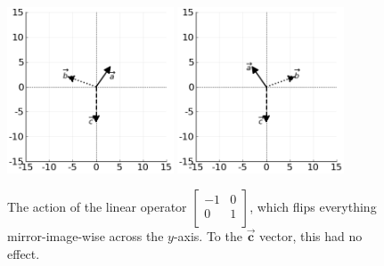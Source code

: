 \begin{figure}[ht]
\centering
\vspace{.2in}
\includegraphics[width=0.44\textwidth]{preoperators.png}
\includegraphics[width=0.44\textwidth]{horizFlipOp.png}
\caption[.]{The action of the linear operator 
{\scriptsize $\begin{bmatrix} -1 & 0 \\ 0 & 1 \\
\end{bmatrix}$,} which flips everything mirror-image-wise across the $y$-axis.
To the $\overrightarrow{\textbf{c}}$ vector, this had no effect.}
\label{fig:horizFlipOp}
\end{figure}

